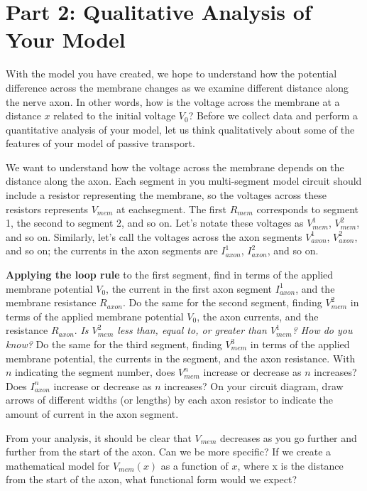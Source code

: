 \section*{Part 2: Qualitative Analysis of Your Model}
With the model you have created, we hope to understand how the potential difference across the membrane changes as we examine different distance along the nerve axon.
In other words, how is the voltage across the membrane at a distance $x$ related to the initial voltage $V_{0}$?
Before we collect data and perform a quantitative analysis of your model, let us think qualitatively about some of the features of your model of passive transport.
\par 
We want to understand how the voltage across the membrane depends on the distance along the axon.
Each segment in you multi-segment model circuit should include a resistor representing the membrane, so the voltages across these resistors represents $V_{mem}$ at eachsegment.
The first $R_{mem}$ corresponds to segment 1, the second to segment 2, and so on. 
Let's notate these voltages as $V_{mem}^{1}$, $V_{mem}^{2}$, and so on.
Similarly, let's call the voltages across the axon segments $V_{axon}^{1}$, $V_{axon}^{2}$, and so on; the currents in the axon segments are $I_{axon}^{1}$, $I_{axon}^{2}$, and so on.
\par 
\textbf{Applying the loop rule} to the first segment, find in terms of the applied membrane potential $V_{0}$, the current in the first axon segment $I_{axon}^{1}$, and the membrane resistance $R_{axon}$.
Do the same for the second segment, finding $V_{mem}^{2}$ in terms of the applied membrane potential $V_{0}$, the axon currents, and the resistance $R_{axon}$.
\emph{Is $V_{mem}^{2}$ less than, equal to, or greater than $V_{mem}^{1}$? How do you know?}
Do the same for the third segment, finding $V_{mem}^{3}$ in terms of the applied membrane potential, the currents in the segment, and the axon resistance.
With $n$ indicating the segment number, does $V_{mem}^{n}$ increase or decrease as $n$ increases?
Does $I_{axon}^{n}$ increase or decrease as $n$ increases? 
On your circuit diagram, draw arrows of different widths (or lengths) by each axon resistor to indicate the amount of current in the axon segment.
\par 
From your analysis, it should be clear that $V_{mem}$ decreases as you go further and further from the start of the axon.
Can we be more specific?
If we create a mathematical model for $V_{mem}(x)$ as a function of $x$, where x is the distance from the start of the axon, what functional form would we expect?

